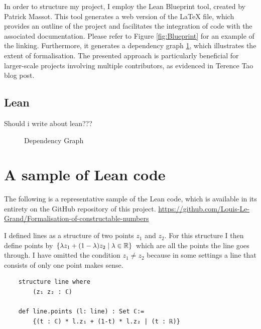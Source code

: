 In order to structure my project, I employ the Lean Blueprint tool, created by Patrick Massot. \cite{Massot_2020}
This tool generates a web version of the LaTeX file, which provides an outline of the project and facilitates the integration of code with the associated documentation. 
Please refer to Figure \ref{fig:Blueprint} for an example of the linking. 
Furthermore, it generates a dependency graph \ref{fig:DependencyGraph}, which illustrates the extent of formalisation.
The presented approach is particularly beneficial for larger-scale projects involving multiple contributors, as evidenced in Terence Tao blog post. \cite{Tao_2023}



\subsection*{Lean}
Should i write about lean???
\clearpage
\begin{figure}[h]
    \centering
    \label{fig:DependencyGraph}
    \caption{Dependency Graph}
\end{figure}
\clearpage
\section{A sample of Lean code} 
The following is a representative sample of the Lean code, which is available in its entirety on the GitHub repository of this project. 
\url{https://github.com/Louis-Le-Grand/Formalisation-of-constructable-numbers}

I defined lines as a structure of two points $z_1$ and $z_2$. 
For this structure I then define points by $\{\lambda z_1 + (1-\lambda)z_2\mid\lambda\in\mathbb{R}\}$ which are all the points the line goes through. 
I have omitted the condition $z_1\ne z_2$ because in some settings a line that consists of only one point makes sense.
\begin{lstlisting}
    structure line where
        (z₁ z₂ : ℂ)

    def line.points (l: line) : Set ℂ:= 
        {(t : ℂ) * l.z₁ + (1-t) * l.z₂ | (t : ℝ)}
\end{lstlisting}

